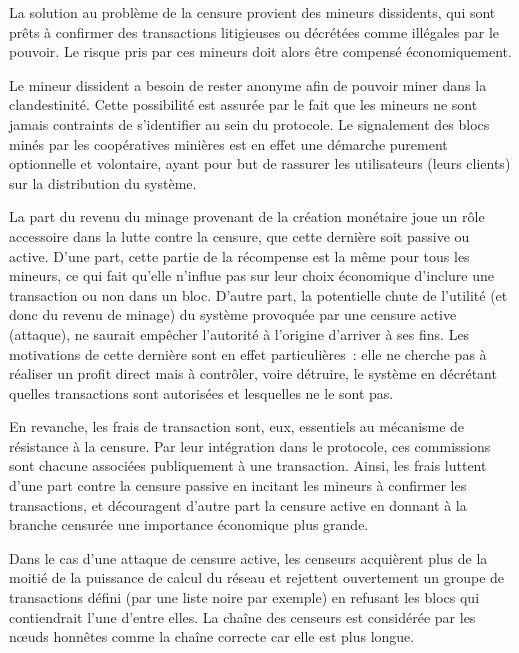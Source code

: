 La solution au problème de la censure provient des mineurs dissidents, qui sont prêts à confirmer des transactions litigieuses ou décrétées comme illégales par le pouvoir. Le risque pris par ces mineurs doit alors être compensé économiquement.

Le mineur dissident a besoin de rester anonyme afin de pouvoir miner dans la clandestinité. Cette possibilité est assurée par le fait que les mineurs ne sont jamais contraints de s'identifier au sein du protocole. Le signalement des blocs minés par les coopératives minières est en effet une démarche purement optionnelle et volontaire, ayant pour but de rassurer les utilisateurs (leurs clients) sur la distribution du système.

La part du revenu du minage provenant de la création monétaire joue un rôle accessoire dans la lutte contre la censure, que cette dernière soit passive ou active. D'une part, cette partie de la récompense est la même pour tous les mineurs, ce qui fait qu'elle n'influe pas sur leur choix économique d'inclure une transaction ou non dans un bloc. D'autre part, la potentielle chute de l'utilité (et donc du revenu de minage) du système provoquée par une censure active (attaque), ne saurait empêcher l'autorité à l'origine d'arriver à ses fins. Les motivations de cette dernière sont en effet particulières~: elle ne cherche pas à réaliser un profit direct mais à contrôler, voire détruire, le système en décrétant quelles transactions sont autorisées et lesquelles ne le sont pas.

En revanche, les frais de transaction sont, eux, essentiels au mécanisme de résistance à la censure. Par leur intégration dans le protocole, ces commissions sont chacune associées publiquement à une transaction. Ainsi, les frais luttent d'une part contre la censure passive en incitant les mineurs à confirmer les transactions, et découragent d'autre part la censure active en donnant à la branche censurée une importance économique plus grande.


Dans le cas d'une attaque de censure active, les censeurs acquièrent plus de la moitié de la puissance de calcul du réseau et rejettent ouvertement un groupe de transactions défini (par une liste noire par exemple) en refusant les blocs qui contiendrait l'une d'entre elles. La chaîne des censeurs est considérée par les nœuds honnêtes comme la chaîne correcte car elle est plus longue.

